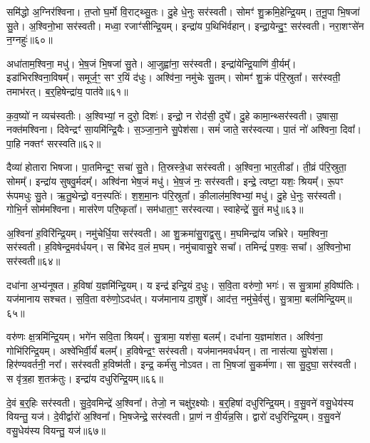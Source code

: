 समि॑द्धो अ॒ग्निर॑श्विना।
त॒प्तो घ॒र्मो वि॒राट्थ्सु॒तः।
दु॒हे धे॒नुः सर॑स्वती।
सोमꣳ॑ शु॒क्रमि॒हेन्द्रि॒यम्।
त॒नू॒पा भि॒षजा॑ सु॒ते।
अ॒श्विनो॒भा सर॑स्वती।
मध्वा॒ रजाꣳ॑सीन्द्रि॒यम्।
इन्द्रा॑य प॒थिभि॑र्वहान्।
इन्द्रा॒येन्दु॒ꣳ॒ सर॑स्वती।
नरा॒शꣳसे॑न न॒ग्नहुः॑॥६०॥\ip

अधा॑ताम॒श्विना॒ मधु॑।
भे॒ष॒जं भि॒षजा॑ सु॒ते।
आ॒जुह्वा॑ना॒ सर॑स्वती।
इन्द्रा॑येन्द्रि॒याणि॑ वी॒र्यम्᳚।
इडा॑भिरश्विना॒विषम्᳚।
समूर्ज॒ꣳ॒ सꣳ र॒यिं द॑धुः।
अश्वि॑ना॒ नमु॑चेः सु॒तम्।
सोमꣳ॑ शु॒क्रं प॑रि॒स्रुता᳚।
सर॑स्वती॒ तमाभ॑रत्।
ब॒र्॒हिषेन्द्रा॑य॒ पात॑वे॥६१॥\ip

क॒व॒ष्यो॑ न व्यच॑स्वतीः।
अ॒श्विभ्यां॒ न दुरो॒ दिशः॑।
इन्द्रो॒ न रोद॑सी॒ दुघे᳚।
दु॒हे कामा॒न्थ्सर॑स्वती।
उ॒षासा॒ नक्त॑मश्विना।
दिवेन्द्रꣳ॑ सा॒यमि॑न्द्रि॒यैः।
स॒ञ्जा॒ना॒ने सु॒पेश॑सा।
समं॑ जाते॒ सर॑स्वत्या।
पा॒तं नो॑ अश्विना॒ दिवा᳚।
पा॒हि नक्तꣳ॑ सरस्वति॥६२॥\ip

दैव्या॑ होतारा भिषजा।
पा॒तमिन्द्र॒ꣳ॒ सचा॑ सु॒ते।
ति॒स्रस्त्रे॒धा सर॑स्वती।
अ॒श्विना॒ भार॒तीडा᳚।
ती॒व्रं प॑रि॒स्रुता॒ सोमम्᳚।
इन्द्रा॑य सुषवु॒र्मदम्᳚।
अश्वि॑ना भेष॒जं मधु॑।
भे॒ष॒जं नः॒ सर॑स्वती।
इन्द्रे॒ त्वष्टा॒ यशः॒ श्रियम्᳚।
रू॒पꣳ रू॑पमधुः सु॒ते।
ऋ॒तु॒थेन्द्रो॒ वन॒स्पतिः॑।
श॒श॒मा॒नः प॑रि॒स्रुता᳚।
की॒लाल॑म॒श्विभ्यां॒ मधु॑।
दु॒हे धे॒नुः सर॑स्वती।
गोभि॒र्न सोम॑मश्विना।
मास॑रेण परि॒ष्कृता᳚।
सम॑धाता॒ꣳ॒ सर॑स्वत्या।
स्वाहेन्द्रे॑ सु॒तं मधु॑॥६३॥\ip\anuvakamend[न॒ग्नहुः॒ पात॑वे सरस्वत्यधुः सु॒ते᳚\-ऽष्टौ च॑]

अ॒श्विना॑ ह॒विरि॑न्द्रि॒यम्।
नमु॑चेर्धि॒या सर॑स्वती।
आ शु॒क्रमा॑सु॒राद्व॒सु।
म॒घमिन्द्रा॑य जभ्रिरे।
यम॒श्विना॒ सर॑स्वती।
ह॒विषेन्द्र॒मव॑र्धयन्।
स बि॑भेद व॒लं म॒घम्।
नमु॑चावासु॒रे सचा᳚।
तमिन्द्रं॑ प॒शवः॒ सचा᳚।
अ॒श्विनो॒भा सर॑स्वती॥६४॥\ip

दधा॑ना अ॒भ्य॑नूषत।
ह॒विषा॑ य॒ज्ञमि॑न्द्रि॒यम्।
य इन्द्र॑ इन्द्रि॒यं द॒धुः।
स॒वि॒ता वरु॑णो॒ भगः॑।
स सु॒त्रामा॑ ह॒विष्प॑तिः।
यज॑मानाय सश्चत।
स॒वि॒ता वरु॑णो॒\-ऽदध॑त्।
यज॑मानाय दा॒शुषे᳚।
आद॑त्त॒ नमु॑चे॒र्वसु॑।
सु॒त्रामा॒ बल॑मिन्द्रि॒यम्॥६५॥\ip

वरु॑णः क्ष॒त्रमि॑न्द्रि॒यम्।
भगे॑न सवि॒ता श्रियम्᳚।
सु॒त्रामा॒ यश॑सा॒ बलम्᳚।
दधा॑ना य॒ज्ञमा॑शत।
अश्वि॑ना॒ गोभि॑रिन्द्रि॒यम्।
अश्वे॑भिर्वी॒र्यं॑ बलम्᳚।
ह॒विषेन्द्र॒ꣳ॒ सर॑स्वती।
यज॑मानमवर्धयन्।
ता नास॑त्या सु॒पेश॑सा।
हिर॑ण्यवर्तनी॒ नरा᳚।
सर॑स्वती ह॒विष्म॑ती।
इन्द्र॒ कर्म॑सु नोऽवत।
ता भि॒षजा॑ सु॒कर्म॑णा।
सा सु॒दुघा॒ सर॑स्वती।
स वृ॑त्र॒हा श॒तक्र॑तुः।
इन्द्रा॑य दधुरिन्द्रि॒यम्॥६६॥\ip\anuvakamend[उ॒भा सर॑स्वती॒ बल॑मिन्द्रि॒यन्नरा॒ षट्च॑]

दे॒वं ब॒र्॒हिः सर॑स्वती।
सु॒दे॒वमिन्द्रे॑ अ॒श्विना᳚।
तेजो॒ न चक्षु॑र॒क्ष्योः।
ब॒र्॒हिषा॑ दधुरिन्द्रि॒यम्।
व॒सु॒वने॑ वसु॒धेय॑स्य वियन्तु॒ यज॑।
दे॒वीर्द्वारो॑ अ॒श्विना᳚।
भि॒षजेन्द्रे॒ सर॑स्वती।
प्रा॒णं न वी॒र्य॑न्न॒सि।
द्वारो॑ दधुरिन्द्रि॒यम्।
व॒सु॒वने॑ वसु॒धेय॑स्य वियन्तु॒ यज॑॥६७॥\ip

